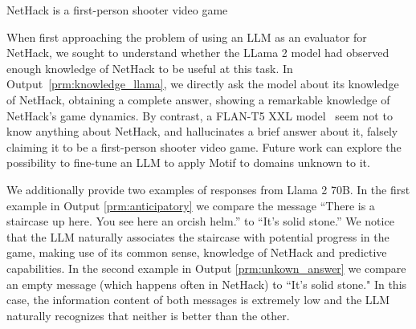 \documentclass{article} %
\begin{document}
\begin{modeloutput}[h]
\begin{mymessagebox}[frametitle=What do you know about NetHack and the goal of a player in it? (FLAN-T5 XXL)]
\small{}\selectfont
NetHack is a first-person shooter video game
\end{mymessagebox}
\caption{Answer of FLAN-T5 XXL~\citep{Chung2022ScalingIL} on a question about its knowledge of NetHack. The model only provides an factually incorrect short answer.}
\label{prm:knowledge_flan}
\end{modeloutput}
When first approaching the problem of using an LLM as an evaluator for NetHack, we sought to understand whether the LLama 2 model had observed enough knowledge of NetHack to be useful at this task.
In Output~\ref{prm:knowledge_llama}, we directly ask the model about its knowledge of NetHack, obtaining a complete answer, showing a remarkable knowledge of NetHack's game dynamics.
By contrast, a FLAN-T5 XXL model~\citep{Chung2022ScalingIL} seem not to know anything about NetHack, and hallucinates a brief answer about it, falsely claiming it to be a first-person shooter video game.
Future work can explore the possibility to fine-tune an LLM to apply Motif to domains unknown to it.

We additionally provide two examples of responses from Llama 2 70B. In the first example in Output \ref{prm:anticipatory} we compare the message “There is a staircase up here. You see here an orcish helm.” to “It’s solid stone.” We notice that the LLM naturally associates the staircase with potential progress in the game, making use of its common sense, knowledge of NetHack and predictive capabilities. In the second example in Output \ref{prm:unkown_answer} we compare an empty message (which happens often in NetHack) to “It’s solid stone." In this case, the information content of both messages is extremely low and the LLM naturally recognizes that neither is better than the other.
\end{document}
